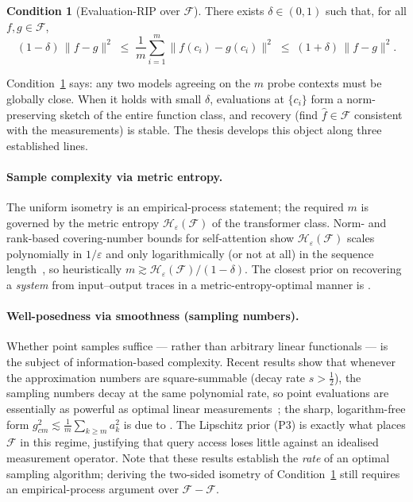 \documentclass[11pt,a4paper]{article}
\theoremstyle{definition}
\newtheorem{condition}{Condition}
\newcommand{\Fclass}{\mathcal{F}}
\newcommand{\Hent}{\mathcal{H}}
\begin{document}
\begin{condition}[Evaluation-RIP over $\Fclass$]\label{cond:rip}
There exists $\delta\in(0,1)$ such that, for all $f,g\in\Fclass$,
\[
  (1-\delta)\,\|f-g\|^2
  \;\le\;
  \frac1m\sum_{i=1}^{m}\|f(c_i)-g(c_i)\|^2
  \;\le\;
  (1+\delta)\,\|f-g\|^2 .
\]
\end{condition}

Condition~\ref{cond:rip} says: any two models agreeing on the $m$ probe contexts
must be globally close. When it holds with small $\delta$, evaluations at
$\{c_i\}$ form a norm-preserving sketch of the entire function class, and recovery
(find $\hat f\in\Fclass$ consistent with the measurements) is stable. The thesis
develops this object along three established lines.

\paragraph{Sample complexity via metric entropy.} The uniform isometry is an
empirical-process statement; the required $m$ is governed by the metric entropy
$\Hent_\varepsilon(\Fclass)$ of the transformer class. Norm- and rank-based
covering-number bounds for self-attention show $\Hent_\varepsilon(\Fclass)$ scales
polynomially in $1/\varepsilon$ and only logarithmically (or not at all) in the
sequence length~\citep{edelman2022inductive,trauger2024sequence}, so heuristically
$m\gtrsim\Hent_\varepsilon(\Fclass)/(1-\delta)$. The closest prior on recovering a
\emph{system} from input--output traces in a metric-entropy-optimal manner is
\citet{hutter2022metric}.

\paragraph{Well-posedness via smoothness (sampling numbers).} Whether point
samples suffice --- rather than arbitrary linear functionals --- is the subject of
information-based complexity. Recent results show that whenever the approximation
numbers are square-summable (decay rate $s>\tfrac12$), the sampling numbers decay
at the same polynomial rate, so point evaluations are essentially as powerful as
optimal linear measurements~\citep{krieg2021function,krieg2021functionII,novak2010tractability};
the sharp, logarithm-free form $g_{cm}^2\lesssim\tfrac1m\sum_{k\ge m}a_k^2$ is due to
\citet{dolbeault2023sharp}.
The Lipschitz prior (P3) is exactly what places $\Fclass$ in this regime,
justifying that query access loses little against an idealised measurement
operator. Note that these results establish the \emph{rate} of an optimal sampling
algorithm; deriving the two-sided isometry of Condition~\ref{cond:rip} still
requires an empirical-process argument over $\Fclass-\Fclass$.
\end{document}
